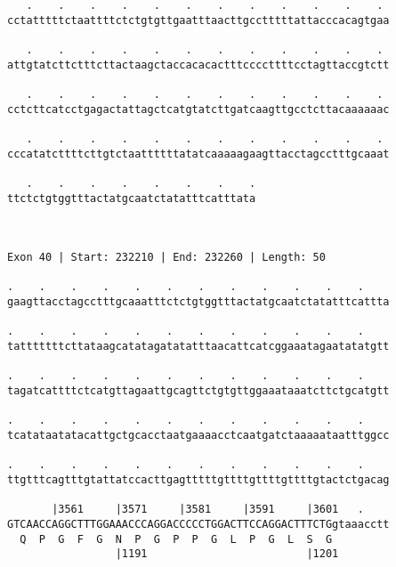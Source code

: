 \documentclass{article}
\begin{document}
\begin{Verbatim}
   .    .    .    .    .    .    .    .    .    .    .    . 
cctatttttctaattttctctgtgttgaatttaacttgcctttttattacccacagtgaa
                                                            
   .    .    .    .    .    .    .    .    .    .    .    . 
attgtatcttctttcttactaagctaccacacactttccccttttcctagttaccgtctt
                                                            
   .    .    .    .    .    .    .    .    .    .    .    . 
cctcttcatcctgagactattagctcatgtatcttgatcaagttgcctcttacaaaaaac
                                                            
   .    .    .    .    .    .    .    .    .    .    .    . 
cccatatcttttcttgtctaattttttatatcaaaaagaagttacctagcctttgcaaat
                                                            
   .    .    .    .    .    .    .    .
ttctctgtggtttactatgcaatctatatttcatttata
                                       
                                       
 
Exon 40 | Start: 232210 | End: 232260 | Length: 50
 
.    .    .    .    .    .    .    .    .    .    .    .    
gaagttacctagcctttgcaaatttctctgtggtttactatgcaatctatatttcattta
                                                            
.    .    .    .    .    .    .    .    .    .    .    .    
tatttttttcttataagcatatagatatatttaacattcatcggaaatagaatatatgtt
                                                            
.    .    .    .    .    .    .    .    .    .    .    .    
tagatcattttctcatgttagaattgcagttctgtgttggaaataaatcttctgcatgtt
                                                            
.    .    .    .    .    .    .    .    .    .    .    .    
tcatataatatacattgctgcacctaatgaaaacctcaatgatctaaaaataatttggcc
                                                            
.    .    .    .    .    .    .    .    .    .    .    .    
ttgtttcagtttgtattatccacttgagtttttgttttgttttgttttgtactctgacag
                                                            
       |3561     |3571     |3581     |3591     |3601   .    
GTCAACCAGGCTTTGGAAACCCAGGACCCCCTGGACTTCCAGGACTTTCTGgtaaacctt
  Q  P  G  F  G  N  P  G  P  P  G  L  P  G  L  S  G         
                 |1191                         |1201        
  

\end{Verbatim}
\end{document}
